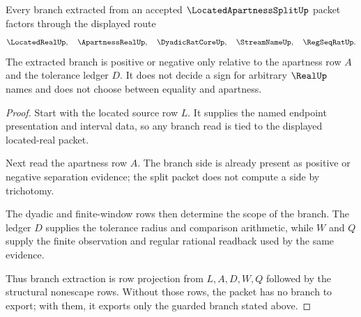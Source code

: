 \begin{theorem}
\label{thm:located-apartness-split-branch-extraction}
Every branch extracted from an accepted $\LocatedApartnessSplitUp$ packet factors through the displayed route
$$
\LocatedRealUp,\quad
\ApartnessRealUp,\quad
\DyadicRatCoreUp,\quad
\StreamNameUp,\quad
\RegSeqRatUp .
$$
The extracted branch is positive or negative only relative to the apartness row $A$ and the tolerance ledger $D$. It does not decide a sign for arbitrary $\RealUp$ names and does not choose between equality and apartness.
\end{theorem}
\begin{proof}
Start with the located source row $L$. It supplies the named endpoint presentation and interval data, so any branch read is tied to the displayed located-real packet.

Next read the apartness row $A$. The branch side is already present as positive or negative separation evidence; the split packet does not compute a side by trichotomy.

The dyadic and finite-window rows then determine the scope of the branch. The ledger $D$ supplies the tolerance radius and comparison arithmetic, while $W$ and $Q$ supply the finite observation and regular rational readback used by the same evidence.

Thus branch extraction is row projection from $L,A,D,W,Q$ followed by the structural nonescape rows. Without those rows, the packet has no branch to export; with them, it exports only the guarded branch stated above.
\end{proof}

